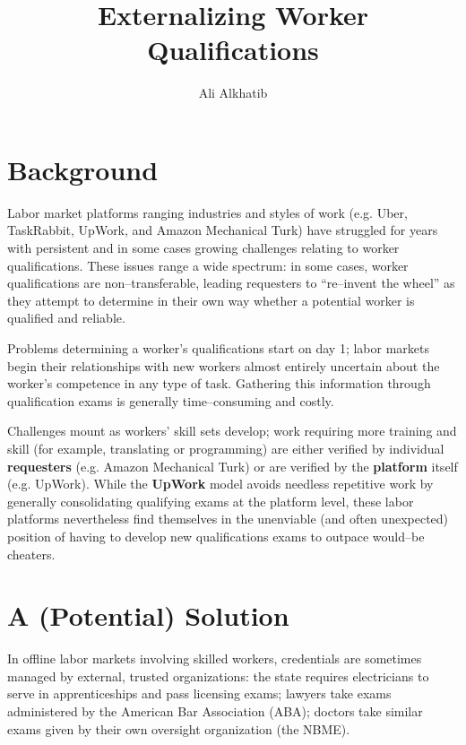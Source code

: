 \documentclass[11pt]{article}
\title{Externalizing Worker Qualifications}
\author{Ali Alkhatib}
\makeatletter
\renewcommand{\maketitle}{\bgroup\setlength{\parindent}{0pt}
\begin{flushleft}
  \textbf{\LARGE{\@title}}

  \@author
\end{flushleft}\egroup
}
\makeatother
\begin{document}
\maketitle{}

\section*{Background}
Labor market platforms ranging industries and styles of work
(e.g. Uber, TaskRabbit, UpWork, and Amazon Mechanical Turk)
have struggled for years with persistent and
in some cases growing
challenges relating to worker qualifications.
These issues range a wide spectrum:
in some cases, worker qualifications are non--transferable,
leading requesters to ``re--invent the wheel'' as they attempt to determine
in their own way whether a potential worker is qualified and reliable.

Problems determining a worker's qualifications start on day 1;
labor markets begin their relationships with new workers
almost entirely uncertain about the worker's competence in any type of task.
Gathering this information through qualification exams is generally
time--consuming and costly.

Challenges mount as workers' skill sets develop;
work requiring more training and skill (for example, translating or programming)
are either verified by individual \textbf{requesters} (e.g. Amazon Mechanical Turk)
or are verified by the \textbf{platform} itself (e.g. UpWork).
While the \textbf{UpWork} model avoids needless repetitive work by
generally consolidating qualifying exams at the platform level,
these labor platforms nevertheless find themselves in the unenviable
(and often unexpected) position of
having to develop new qualifications exams to outpace would--be cheaters.





\section*{A (Potential) Solution}
In offline labor markets involving skilled workers,
credentials are sometimes managed by
external, trusted organizations:
the state requires electricians
to serve in apprenticeships and
pass licensing exams;
lawyers take exams administered by the American Bar Association (ABA);
doctors take similar exams given by their own oversight organization (the NBME).
\end{document}
